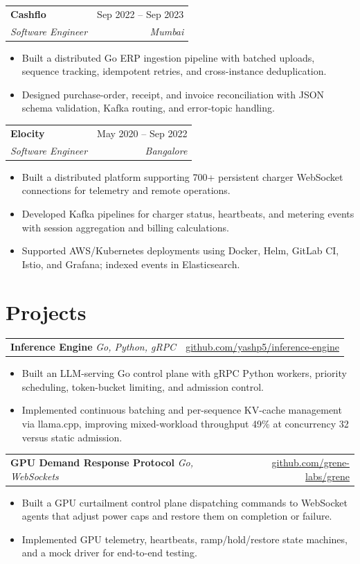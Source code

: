 \documentclass[letterpaper,12pt]{article}
\makeatletter
\newcommand{\entry}[4]{%
  \begin{tabularx}{\textwidth}{@{}X@{}r@{}}
    \textbf{#1} & {\small\color{muted}#2} \\
    {\small\itshape #3} & {\small\itshape\color{muted}#4} \\
  \end{tabularx}\vspace{3pt}
}
\newcommand{\project}[3]{%
  \begin{tabularx}{\textwidth}{@{}X@{}r@{}}
    \textbf{#1}\; {\small\color{muted}\itshape #2} & {\small #3} \\
  \end{tabularx}\vspace{3.5pt}
}
\newenvironment{bullets}
  {\begin{itemize}[leftmargin=1.1em, itemsep=0pt, topsep=0pt, parsep=0pt, label={\color{muted}\footnotesize\textbullet}]\fontsize{11}{13.0}\selectfont}
  {\end{itemize}\vspace{-3pt}}
\makeatother
\begin{document}
\vspace{7pt}
\entry{Cashflo}{Sep 2022 -- Sep 2023}{Software Engineer}{Mumbai}
\begin{bullets}
  \item Built a distributed Go ERP ingestion pipeline with batched uploads, sequence tracking, idempotent retries, and cross-instance deduplication.
  \item Designed purchase-order, receipt, and invoice reconciliation with JSON schema validation, Kafka routing, and error-topic handling.
\end{bullets}

\vspace{7pt}
\entry{Elocity}{May 2020 -- Sep 2022}{Software Engineer}{Bangalore}
\begin{bullets}
  \item Built a distributed platform supporting 700+ persistent charger WebSocket connections for telemetry and remote operations.
  \item Developed Kafka pipelines for charger status, heartbeats, and metering events with session aggregation and billing calculations.
  \item Supported AWS/Kubernetes deployments using Docker, Helm, GitLab CI, Istio, and Grafana; indexed events in Elasticsearch.
\end{bullets}

\section{Projects}

\project{Inference Engine}{Go, Python, gRPC}{\href{https://github.com/yashp5/inference-engine}{github.com/yashp5/inference-engine}}
\begin{bullets}
  \item Built an LLM-serving Go control plane with gRPC Python workers, priority scheduling, token-bucket limiting, and admission control.
  \item Implemented continuous batching and per-sequence KV-cache management via llama.cpp, improving mixed-workload throughput 49\% at concurrency 32 versus static admission.
\end{bullets}

\vspace{6pt}
\project{GPU Demand Response Protocol}{Go, WebSockets}{\href{https://github.com/grene-labs/grene}{github.com/grene-labs/grene}}
\begin{bullets}
  \item Built a GPU curtailment control plane dispatching commands to WebSocket agents that adjust power caps and restore them on completion or failure.
  \item Implemented GPU telemetry, heartbeats, ramp/hold/restore state machines, and a mock driver for end-to-end testing.
\end{bullets}
\end{document}
